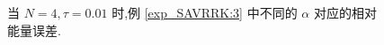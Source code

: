 \documentclass[aspectratio=169]{beamer}
\numberwithin{theorem}{section} %
\numberwithin{equation}{section}%
\numberwithin{figure}{section}%
\numberwithin{table}{section}%
\begin{document}
\begin{frame}%
	\begin{figure}[H]
		\begin{center}
		\caption{当 $N=4, \tau=0.01$ 时,例 \ref{exp_SAVRRK:3} 中不同的 $\alpha$ 对应的相对能量误差.}
		\label{fig_SAVRRK:3-4}
		\end{center}
		\end{figure}
\end{frame}
\end{document}
